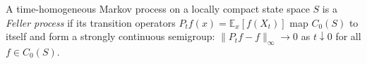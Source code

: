 
A time-homogeneous Markov process on a locally compact state space $S$ is a \emph{Feller process} if its transition operators $P_tf(x)=\mathbb E_x[f(X_t)]$ map $C_0(S)$ to itself and form a strongly continuous semigroup: $\|P_tf-f\|_\infty\to0$ as $t\downarrow0$ for all $f\in C_0(S)$.
